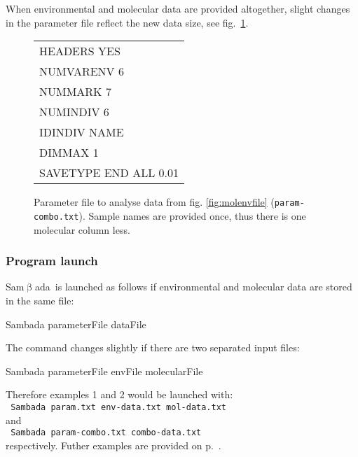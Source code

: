 \documentclass[a4paper,11pt]{article}
\newcommand{\smb}{\textsf{Sam$\upbeta$ada}}
\newenvironment{launch}{\begin{mdframed}\ttfamily}{\end{mdframed}}
\begin{document}
When environmental and molecular data are provided altogether, slight changes in the parameter file reflect the new data size, see fig.~\ref{fig:fichier-param-combo}.
\begin{figure}[htbp]
\centering
\ttfamily
\begin{tabular}{|l|}
\hline
HEADERS YES\\	
NUMVARENV 6\\	
NUMMARK 7	\\
NUMINDIV 6\\
IDINDIV NAME\\
DIMMAX 1\\
SAVETYPE END ALL 0.01\\
\hline
\end{tabular}%
\caption{Parameter file to analyse data from fig. \ref{fig:molenvfile} (\texttt{param-combo.txt}).
Sample names are provided once, thus there is one molecular column less.}
\label{fig:fichier-param-combo}
\end{figure}


\subsubsection{Program launch}

\smb\ is launched as follows if environmental and molecular data are stored in the same file:
\begin{launch} Sambada parameterFile dataFile\end{launch}
The command changes slightly if there are two separated input files:\\
\begin{launch} Sambada parameterFile envFile molecularFile \end{launch}

\noindent Therefore examples 1 and 2 would be launched with:\\
\verb+ Sambada param.txt env-data.txt mol-data.txt+\\
and\\
\verb+ Sambada param-combo.txt combo-data.txt+\\
respectively.
Futher examples are provided on p.~\pageref{sec:examples-launch}.
\end{document}

